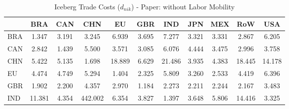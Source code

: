 \begin{table}[htbp]
\centering
\caption{Iceberg Trade Costs ($d_{nik}$) - Paper: without Labor Mobility} 
\label{tab:iceberg_Paper}
\begin{tabular}{lcccccccccc}
  \hline
 & BRA & CAN & CHN & EU & GBR & IND & JPN & MEX & RoW & USA \\ 
  \hline
BRA & \textcolor[RGB]{245,158,10}{1.347} & \textcolor[RGB]{153,99,102}{3.191} & \textcolor[RGB]{148,96,107}{3.245} & \textcolor[RGB]{20,13,235}{6.939} & \textcolor[RGB]{112,73,143}{3.695} & \textcolor[RGB]{18,12,237}{7.277} & \textcolor[RGB]{138,89,117}{3.321} & \textcolor[RGB]{130,84,125}{3.331} & \textcolor[RGB]{178,115,76}{2.867} & \textcolor[RGB]{33,21,222}{6.205} \\ 
  CAN & \textcolor[RGB]{181,117,74}{2.842} & \textcolor[RGB]{235,152,20}{1.439} & \textcolor[RGB]{46,30,209}{5.500} & \textcolor[RGB]{117,76,138}{3.571} & \textcolor[RGB]{166,107,89}{3.085} & \textcolor[RGB]{36,23,219}{6.076} & \textcolor[RGB]{69,45,186}{4.444} & \textcolor[RGB]{128,82,128}{3.475} & \textcolor[RGB]{168,109,87}{2.996} & \textcolor[RGB]{107,69,148}{3.758} \\ 
  CHN & \textcolor[RGB]{51,33,204}{5.422} & \textcolor[RGB]{56,36,199}{5.135} & \textcolor[RGB]{230,148,26}{1.698} & \textcolor[RGB]{5,3,250}{18.889} & \textcolor[RGB]{25,16,230}{6.629} & \textcolor[RGB]{3,2,252}{21.486} & \textcolor[RGB]{97,63,158}{3.935} & \textcolor[RGB]{74,48,181}{4.383} & \textcolor[RGB]{8,5,247}{18.445} & \textcolor[RGB]{13,8,242}{14.178} \\ 
  EU & \textcolor[RGB]{66,43,189}{4.474} & \textcolor[RGB]{59,38,196}{4.749} & \textcolor[RGB]{54,35,201}{5.294} & \textcolor[RGB]{240,155,15}{1.404} & \textcolor[RGB]{204,132,51}{2.325} & \textcolor[RGB]{38,25,217}{5.809} & \textcolor[RGB]{145,94,110}{3.260} & \textcolor[RGB]{191,124,64}{2.533} & \textcolor[RGB]{71,46,184}{4.419} & \textcolor[RGB]{28,18,227}{6.396} \\ 
  GBR & \textcolor[RGB]{227,147,28}{1.902} & \textcolor[RGB]{217,140,38}{2.200} & \textcolor[RGB]{77,50,178}{4.357} & \textcolor[RGB]{171,111,84}{2.970} & \textcolor[RGB]{252,163,3}{1.184} & \textcolor[RGB]{207,134,48}{2.273} & \textcolor[RGB]{214,139,41}{2.211} & \textcolor[RGB]{212,137,43}{2.244} & \textcolor[RGB]{219,142,36}{2.167} & \textcolor[RGB]{125,81,130}{3.483} \\ 
  IND & \textcolor[RGB]{15,10,240}{11.381} & \textcolor[RGB]{79,51,176}{4.354} & \textcolor[RGB]{0,0,255}{442.002} & \textcolor[RGB]{31,20,224}{6.354} & \textcolor[RGB]{99,64,156}{3.827} & \textcolor[RGB]{242,157,13}{1.397} & \textcolor[RGB]{115,74,140}{3.648} & \textcolor[RGB]{41,26,214}{5.806} & \textcolor[RGB]{10,7,245}{14.416} & \textcolor[RGB]{135,87,120}{3.325} \\ 

\end{tabular}
\end{table}
